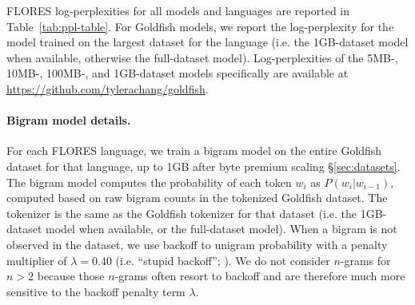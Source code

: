 \documentclass[11pt]{article}
\begin{document}
FLORES log-perplexities for all models and languages are reported in Table~\ref{tab:ppl-table}.
For Goldfish models, we report the log-perplexity for the model trained on the largest dataset for the language (i.e. the 1GB-dataset model when available, otherwise the full-dataset model).
Log-perplexities of the 5MB-, 10MB-, 100MB-, and 1GB-dataset models specifically are available at \url{https://github.com/tylerachang/goldfish}.

\paragraph{Bigram model details.}
For each FLORES language, we train a bigram model on the entire Goldfish dataset for that language, up to 1GB after byte premium scaling \S\ref{sec:datasets}.
The bigram model computes the probability of each token $w_i$ as $P(w_i | w_{i-1})$, computed based on raw bigram counts in the tokenized Goldfish dataset.
The tokenizer is the same as the Goldfish tokenizer for that dataset (i.e. the 1GB-dataset model when available, or the full-dataset model).
When a bigram is not observed in the dataset, we use backoff to unigram probability with a penalty multiplier of $\lambda=0.40$ (i.e. ``stupid backoff''; \citealp{brants-etal-2007-large}).
We do not consider $n$-grams for $n>2$ because those $n$-grams often resort to backoff and are therefore much more sensitive to the backoff penalty term $\lambda$.
\end{document}
